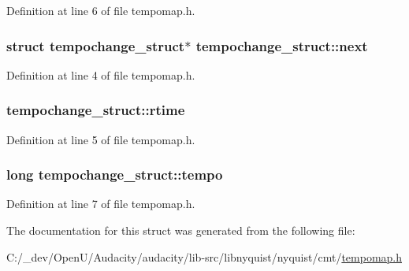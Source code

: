 Definition at line 6 of file tempomap.\+h.

\subsubsection[{\texorpdfstring{next}{next}}]{\setlength{\rightskip}{0pt plus 5cm}struct {\bf tempochange\+\_\+struct}$\ast$ tempochange\+\_\+struct\+::next}\hypertarget{structtempochange__struct_a90a5916d97068ed0cff912f5ac96b9ed}{}\label{structtempochange__struct_a90a5916d97068ed0cff912f5ac96b9ed}


Definition at line 4 of file tempomap.\+h.

\subsubsection[{\texorpdfstring{rtime}{rtime}}]{ tempochange\+\_\+struct\+::rtime}\hypertarget{structtempochange__struct_ae3e15e3f90f822990021df07fc37d6a3}{}\label{structtempochange__struct_ae3e15e3f90f822990021df07fc37d6a3}


Definition at line 5 of file tempomap.\+h.

\subsubsection[{\texorpdfstring{tempo}{tempo}}]{\setlength{\rightskip}{0pt plus 5cm}long tempochange\+\_\+struct\+::tempo}\hypertarget{structtempochange__struct_aa306a493598eafab30777e4f47c71525}{}\label{structtempochange__struct_aa306a493598eafab30777e4f47c71525}


Definition at line 7 of file tempomap.\+h.



The documentation for this struct was generated from the following file\+:\begin{DoxyCompactItemize}
\item 
C\+:/\+\_\+dev/\+Open\+U/\+Audacity/audacity/lib-\/src/libnyquist/nyquist/cmt/\hyperlink{tempomap_8h}{tempomap.\+h}\end{DoxyCompactItemize}
